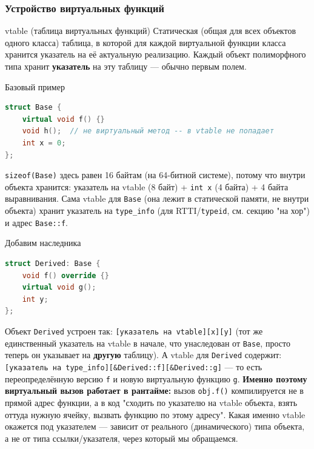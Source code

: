 \subsubsection{Устройство виртуальных функций}
\begin{definition}{vtable (таблица виртуальных функций)}{}
Статическая (общая для всех объектов одного класса) таблица, в которой для каждой виртуальной функции класса хранится указатель на её актуальную реализацию. Каждый объект полиморфного типа хранит \textbf{указатель} на эту таблицу --- обычно первым полем.
\end{definition}
\begin{implementation}{Базовый пример}{}
\begin{lstlisting}[language=C++]
struct Base {
    virtual void f() {}
    void h();  // не виртуальный метод -- в vtable не попадает
    int x = 0;
};
\end{lstlisting}
\end{implementation}
\texttt{sizeof(Base)} здесь равен 16 байтам (на 64-битной системе), потому что внутри объекта хранится: указатель на vtable (8 байт) + \texttt{int x} (4 байта) + 4 байта выравнивания. Сама vtable для \texttt{Base} (она лежит в статической памяти, не внутри объекта) хранит указатель на \texttt{type\_info} (для RTTI/\texttt{typeid}, см. секцию "на хор") и адрес \texttt{Base::f}.
\begin{implementation}{Добавим наследника}{}
\begin{lstlisting}[language=C++]
struct Derived: Base {
    void f() override {}
    virtual void g();
    int y;
};
\end{lstlisting}
\end{implementation}
Объект \texttt{Derived} устроен так: \texttt{[указатель на vtable][x][y]} (тот же единственный указатель на vtable в начале, что унаследован от \texttt{Base}, просто теперь он указывает на \textbf{другую} таблицу). А vtable для \texttt{Derived} содержит: \texttt{[указатель на type\_info][\&Derived::f][\&Derived::g]} --- то есть переопределённую версию \texttt{f} и новую виртуальную функцию \texttt{g}.
\textbf{Именно поэтому виртуальный вызов работает в рантайме:} вызов \texttt{obj.f()} компилируется не в прямой адрес функции, а в код "сходить по указателю на vtable объекта, взять оттуда нужную ячейку, вызвать функцию по этому адресу". Какая именно vtable окажется под указателем --- зависит от реального (динамического) типа объекта, а не от типа ссылки/указателя, через который мы обращаемся.
